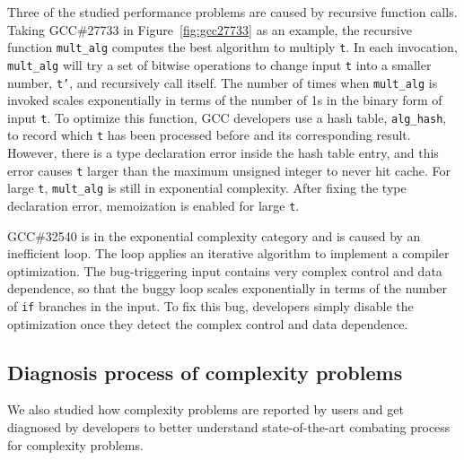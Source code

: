 Three of the studied performance problems are caused by recursive function calls. 
Taking GCC\#27733 in Figure~\ref{fig:gcc27733} as an example, 
the recursive function \texttt{mult\_alg} computes the best algorithm to multiply \texttt{t}.
In each invocation, \texttt{mult\_alg} will try a set of bitwise 
operations to change input 
\texttt{t} into a smaller number, \texttt{t'}, 
and recursively call itself.
The number of times when \texttt{mult\_alg} is invoked scales exponentially 
in terms of the number of 1s in the binary form of input \texttt{t}.
To optimize this function, 
GCC developers use a hash table, \texttt{alg\_hash}, to record
which \texttt{t} has been processed before and its corresponding result.
However, there is a type declaration error inside the hash table entry,
and this error causes \texttt{t} larger than the maximum unsigned integer to never hit cache.
For large \texttt{t}, \texttt{mult\_alg} is still in exponential complexity. 
After fixing the type declaration error, 
memoization is enabled for large \texttt{t}. 

GCC\#32540 is in the exponential complexity category and is caused by an inefficient loop. 
The loop applies an iterative algorithm to implement a compiler optimization. 
The bug-triggering input contains very complex control and data dependence,  
so that the buggy loop scales exponentially in terms of the number 
of \texttt{if} branches in the input. 
To fix this bug, developers simply disable the optimization 
once they detect the complex control and data dependence.  


\subsection{Diagnosis process of complexity problems}
\label{sec:process}

We also studied how complexity problems are reported by users 
and get diagnosed by developers 
to better understand state-of-the-art combating process for complexity problems. 

